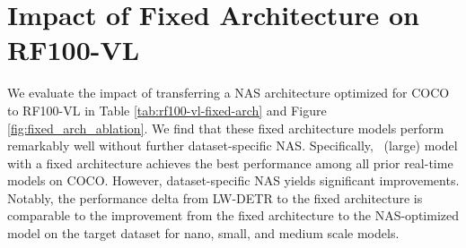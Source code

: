 {
\setlength{\tabcolsep}{0.25em}
\begin{table}[h]
\caption{\textbf{Regression Analysis.} We evaluate the linear relationships between various dataset characteristics and model parameters. Although these correlations are non-linear, the line-of-best-fit helps explain general trends. P-values indicate the significance of the correlation.} 
\label{tab:regression-results}
\end{table}
}

\section{Impact of Fixed Architecture on RF100-VL}
We evaluate the impact of transferring a NAS architecture optimized for COCO to RF100-VL in Table \ref{tab:rf100-vl-fixed-arch} and Figure \ref{fig:fixed_arch_ablation}. We find that these fixed architecture models perform remarkably well without further dataset-specific NAS. Specifically, \method \ (large) model with a fixed architecture achieves the best performance among all prior real-time models on COCO. However, dataset-specific NAS yields  significant improvements. Notably, the performance delta from LW-DETR to the fixed architecture is comparable to the improvement from the fixed architecture to the NAS-optimized model on the target dataset for nano, small, and medium scale models.


